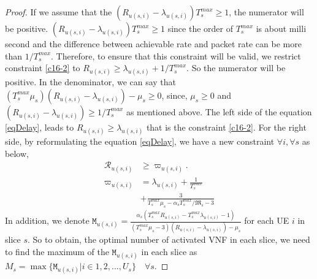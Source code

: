 \documentclass[lettersize,journal]{IEEEtran}
\begin{document}
\begin{proof}
If we assume that the $(R_{u(s,i)}-\lambda_{u(s,i)})T^{max}_s \geq 1$, the numerator will be positive.
$(R_{u(s,i)}-\lambda_{u(s,i)})T^{max}_s \geq 1$ since the order of $T^{max}_s$ is about milli second and the difference between achievable rate and packet rate can be more than $1/T^{max}_s$.
Therefore, to ensure that this constraint will be valid, we restrict constraint \eqref{c16-2} to $R_{u(s,i)} \geq \lambda_{u(s,i)} + 1/T^{max}_s$.
So the numerator will be positive.
In the denominator, we can say that $(T^{max}_s\mu_s)(R_{u(s,i)}-\lambda_{u(s,i)}) - \mu_s \geq 0 $, since,
$\mu_s \geq 0$ and
$(R_{u(s,i)}-\lambda_{u(s,i)}) \geq 1/T^{max}_s$ as mentioned above.
The left side of the equation \eqref{eqDelay}, leads to $R_{u(s,i)} \geq \lambda_{u(s,i)}$ that is the constraint \eqref{c16-2}.
For the right side, by reformulating the equation \eqref{eqDelay}, we have a new constraint $\forall i, \forall s$ as below,
\begin{subequations}\label{RM}
\begin{alignat}{4}
\mathcal{R}_{u(s,i)} &\geq \varpi_{u(s,i)}. \\
\varpi_{u(s,i)} &= \lambda_{u(s,i)} + \frac{1}{T^{max}_s}\\
& + \frac{3}{T^{max}_s\mu_s-\alpha_s T^{max}_s/\mathfrak{M}_s-3}
\end{alignat}
\end{subequations}
In addition, we denote $\mathtt{M}_{u(s,i)} = \frac{\alpha_s(T^{max}_s R_{u(s,i)}-T^{max}_s\lambda_{u(s,i)} -1)}{(T^{max}_s\mu_s-3)(R_{u(s,i)}-\lambda_{u(s,i)}) - \mu_s }$ for each UE $i$ in slice $s$.
So to obtain, the optimal number of activated VNF in each slice, we need to find the maximum of the
$\mathtt{M}_{u(s,i)}$ in each slice as $M_s = \max\{\mathtt{M}_{u(s,i)} | i \in 1,2,..., U_s\} \quad \forall s $.
\end{proof}
\end{document}

